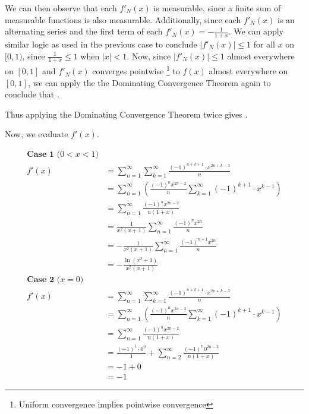 \documentclass{article}
\begin{document}
We can then observe that each $f'_N(x)$ is measurable, since a finite sum of measurable functions is also measurable. Additionally, since each $f'_N(x)$ is an alternating series and the first term of each $f'_N(x)=-\frac{1}{1+x}$. We can apply similar logic as used in the previous case to conclude $|f'_N(x)|\leq1$ for all $x$ on $[0,1)$, since $\frac{1}{1+x}\leq1$ when $|x|<1$. Now, since $|f'_N(x)|\leq1$ almost everywhere on $[0,1]$ and $f'_N(x)$ converges pointwise \footnote{Uniform convergence implies pointwise convergence} to $f(x)$ almost everywhere on $[0,1]$, we can apply the the Dominating Convergence Theorem again to conclude that  .

Thus applying the Dominating Convergence Theorem twice gives \newline {}.



\vspace{5mm}
Now, we evaluate $f'(x)$.

\begin{align*}
\textbf{Case 1 ($0 < x <1$)} \\
    f'(x) &= \sum_{n=1}^{\infty}\sum_{k=1}^{\infty}\frac{ (-1)^{n+k+1}\cdot x^{2n+k-3}}{n} \\
    &= \sum_{n=1}^{\infty}\left(\frac{(-1)^{n}x^{2n-2}}{n}\sum_{k=1}^{\infty}(-1)^{k+1}\cdot x^{k-1}\right)\\
    &=\sum_{n=1}^{\infty} \frac{(-1)^nx^{2n-2}}{n(1+x)} \\
    &= \frac{1}{x^2(x+1)}\sum_{n=1}^{\infty}\frac{(-1)^nx^{2n}}{n} \\
    &= -\frac{1}{x^2(x+1)}\sum_{n=1}^{\infty}\frac{(-1)^{n+1}x^{2n}}{n} \\
    &=  -\frac{\ln(x^2+1)}{x^2(x+1)} \\
\textbf{Case 2 ($x=0$)} \\
    f'(x) &= \sum_{n=1}^{\infty}\sum_{k=1}^{\infty}\frac{ (-1)^{n+k+1}\cdot x^{2n+k-3}}{n} \\
    &= \sum_{n=1}^{\infty}\left(\frac{(-1)^{n}x^{2n-2}}{n}\sum_{k=1}^{\infty}(-1)^{k+1}\cdot x^{k-1}\right)\\
    &=\sum_{n=1}^{\infty} \frac{(-1)^nx^{2n-2}}{n(1+x)} \\
    &= \frac{(-1)^1\cdot0^0}{1}+\sum_{n=2}^{\infty} \frac{(-1)^n0^{2n-2}}{n(1+x)} \\
    &= -1 + 0 \\
    &= -1
\end{align*}
\end{document}
